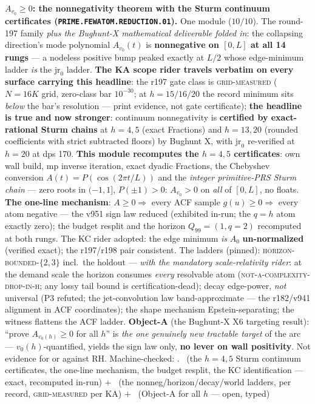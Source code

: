 \par\smallskip\noindent\textbf{$A_{v_0} \ge 0$: the nonnegativity
theorem with the Sturm continuum certificates
(\texttt{PRIME.\allowbreak FEWATOM.\allowbreak REDUCTION.01}).}
One module ($10/10$).  The round-197 family \emph{plus the
Bughunt-X mathematical deliverable folded in}: the collapsing
direction's mode polynomial $A_{v_0}(t)$ is \textbf{nonnegative
on $[0, L]$ at all 14 rungs} --- a nodeless positive bump peaked
exactly at $L/2$ whose edge-minimum ladder \emph{is} the
$\mathrm{jr}_0$ ladder.  \textbf{The KA scope rider travels
verbatim on every surface carrying this headline}: the r197 gate
class is \textsc{grid-measured} ($N = 16K$ grid, zero-class bar
$10^{-30}$; at $h = 15/16/20$ the record minimum sits \emph{below}
the bar's resolution --- print evidence, not gate certificate);
\textbf{the headline is true and now stronger}: continuum
nonnegativity is \textbf{certified by exact-rational Sturm
chains} at $h = 4, 5$ (exact Fractions) and $h = 13, 20$ (rounded
coefficients with strict subtracted floors) by Bughunt X, with
$\mathrm{jr}_0$ re-verified at $h = 20$ at dps 170.  \textbf{This
module recomputes the $h = 4, 5$ certificates}: own wall build,
mp inverse iteration, exact dyadic Fractions, the Chebyshev
conversion $A(t) = P(\cos(2\pi t/L))$ and the \emph{integer
primitive-PRS Sturm chain} --- zero roots in $(-1, 1]$,
$P(\pm 1) > 0$: $A_{v_0} > 0$ on \emph{all} of $[0, L]$, no
floats.  \textbf{The one-line mechanism}: $A \ge 0 \Rightarrow$
every ACF sample $g(u) \ge 0 \Rightarrow$ every atom negative ---
the v951 sign law reduced (exhibited in-run; the $q = h$ atom
exactly zero); the budget resplit and the horizon $Q_{99} = (1,
q = 2)$ recomputed at both rungs.  The KC rider adopted: the edge
minimum \emph{is} $A_0$ \textbf{un-normalized} (verified exact);
the r197/r198 pair consistent.  The ladders (pinned):
\textsc{horizon-bounded-$\{2, 3\}$} incl.\ the holdout ---
\emph{with the mandatory scale-relativity rider}: at the demand
scale the horizon consumes \emph{every} resolvable atom
(\textsc{not-a-complexity-drop-in-h}; any lossy tail bound is
certification-dead); decay edge-power, \emph{not} universal (P3
refuted; the jet-convolution law band-approximate --- the
r182/v941 alignment in ACF coordinates); the shape mechanism
Epstein-separating; the witness flattens the ACF ladder.
\textbf{Object-A} (the Bughunt-X X6 targeting result): ``prove
$A_{v_0(h)} \ge 0$ for all $h$'' is \emph{the one genuinely new
tractable target} of the arc --- $v_0(h)$-quantified, yields the
sign law only, \textbf{no lever on wall positivity}.  Not
evidence for or against RH.
Machine-checked: .
\mE\ (the $h = 4, 5$ Sturm continuum certificates, the one-line
mechanism, the budget resplit, the KC identification --- exact,
recomputed in-run) $+$ \mC\ (the nonneg/horizon/decay/world
ladders, per record, \textsc{grid-measured} per KA) $+$ \mO\
(Object-A for all $h$ --- open, typed)
\par\smallskip


